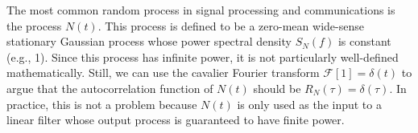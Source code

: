 The most common random process in signal processing and communications is the  process $N(t)$.
This process is defined to be a zero-mean wide-sense stationary Gaussian process whose power spectral density $S_N (f)$ is constant (e.g., 1).
Since this process has infinite power, it is not particularly well-defined mathematically.
Still, we can use the cavalier Fourier transform $\mathcal{F} [ 1 ] = \delta(t)$ to argue that the autocorrelation function of $N(t)$ should be $R_N (\tau) = \delta(\tau)$.
In practice, this is not a problem because $N(t)$ is only used as the input to a linear filter whose output process is guaranteed to have finite power.


